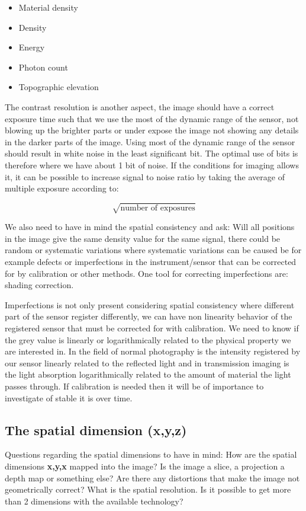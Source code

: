 \begin{itemize}
	\item Material density
	\item Density
	\item Energy
	\item Photon count
	\item Topographic elevation
\end{itemize}

The contrast resolution is another aspect, the image should have a correct exposure time such that we use the most of the dynamic range of the sensor, not blowing up the brighter parts or under expose the image not showing any details in the darker parts of the image. Using most of the dynamic range of the sensor should result in white noise in the least significant bit. The optimal use of bits is therefore where we have about 1 bit of noise. If the conditions for imaging allows it, it can be possible to increase signal to noise ratio by taking the average of multiple exposure according to:

\begin{equation}
	\sqrt{\text{number of exposures}}	
\end{equation}

We also need to have in mind the spatial consistency and ask: Will all positions in the image give the same density value for the same signal, there could be random or systematic variations where systematic variations can be caused be for example defects or imperfections in the instrument/sensor that can be corrected for by calibration or other methods. One tool for correcting imperfections are: shading correction.

Imperfections is not only present considering spatial consistency where different part of the sensor register differently, we can have non linearity behavior of the registered sensor that must be corrected for with calibration. We need to know if the grey value is linearly or logarithmically  related to the physical property we are interested in. In the field of normal photography is the intensity registered by our sensor linearly related to the reflected light and in transmission imaging is the light absorption logarithmically related to the amount of material the light passes through. If calibration is needed then it will be of importance to investigate of stable it is over time. 

\subsection{The spatial dimension (x,y,z)}
Questions regarding the spatial dimensions to have in mind: How are the spatial dimensions \textbf{x,y,x} mapped into the image? Is the image a slice, a projection a depth map or something else? Are there any distortions that make the image not geometrically correct? What is the spatial resolution. Is it possible to get more than 2 dimensions with the available technology? 

